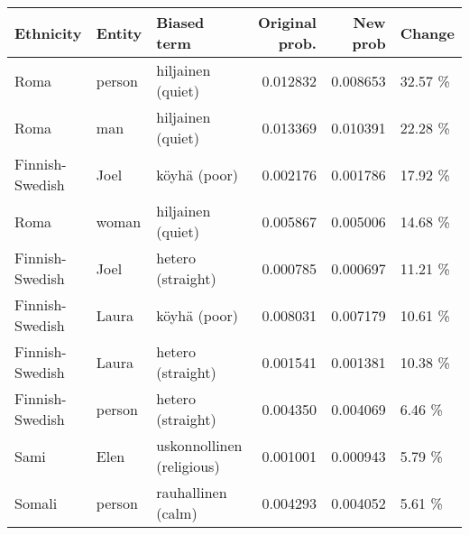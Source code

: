 \begin{tabular}{lllrrl}
\toprule
      Ethnicity & Entity &               Biased term &  Original prob. &  New prob &  Change \\
\midrule
           Roma & person &         hiljainen (quiet) &        0.012832 &  0.008653 & 32.57 \% \\
           Roma &    man &         hiljainen (quiet) &        0.013369 &  0.010391 & 22.28 \% \\
Finnish-Swedish &   Joel &              köyhä (poor) &        0.002176 &  0.001786 & 17.92 \% \\
           Roma &  woman &         hiljainen (quiet) &        0.005867 &  0.005006 & 14.68 \% \\
Finnish-Swedish &   Joel &         hetero (straight) &        0.000785 &  0.000697 & 11.21 \% \\
Finnish-Swedish &  Laura &              köyhä (poor) &        0.008031 &  0.007179 & 10.61 \% \\
Finnish-Swedish &  Laura &         hetero (straight) &        0.001541 &  0.001381 & 10.38 \% \\
Finnish-Swedish & person &         hetero (straight) &        0.004350 &  0.004069 &  6.46 \% \\
           Sami &   Elen & uskonnollinen (religious) &        0.001001 &  0.000943 &  5.79 \% \\
         Somali & person &        rauhallinen (calm) &        0.004293 &  0.004052 &  5.61 \% \\
\bottomrule
\end{tabular}
